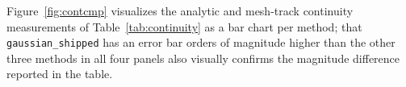 Figure~\ref{fig:contcmp} visualizes the analytic and mesh-track continuity measurements of Table~\ref{tab:continuity} as a bar chart per method; that \texttt{gaussian\_shipped} has an error bar orders of magnitude higher than the other three methods in all four panels also visually confirms the magnitude difference reported in the table.
